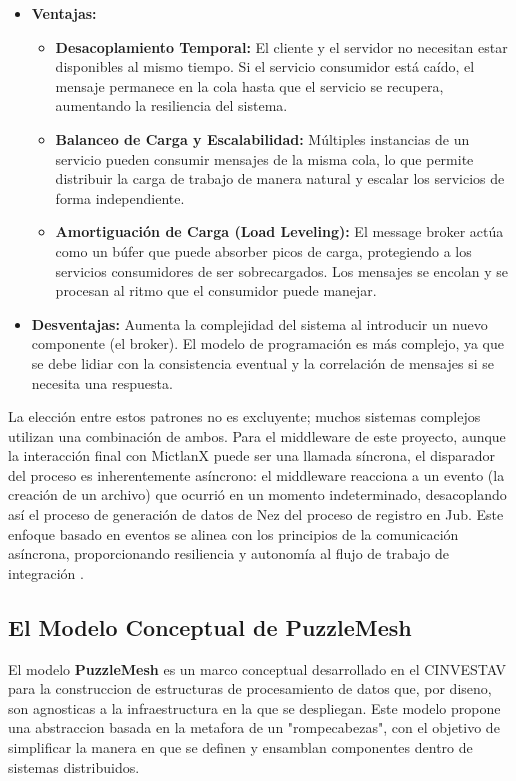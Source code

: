 \begin{itemize}
    \item \textbf{Ventajas:}
    \begin{itemize}
        \item \textbf{Desacoplamiento Temporal:} El cliente y el servidor no necesitan estar disponibles al mismo tiempo. Si el servicio consumidor está caído, el mensaje permanece en la cola hasta que el servicio se recupera, aumentando la resiliencia del sistema.
        \item \textbf{Balanceo de Carga y Escalabilidad:} Múltiples instancias de un servicio pueden consumir mensajes de la misma cola, lo que permite distribuir la carga de trabajo de manera natural y escalar los servicios de forma independiente.
        \item \textbf{Amortiguación de Carga (Load Leveling):} El message broker actúa como un búfer que puede absorber picos de carga, protegiendo a los servicios consumidores de ser sobrecargados. Los mensajes se encolan y se procesan al ritmo que el consumidor puede manejar.
    \end{itemize}
    \item \textbf{Desventajas:} Aumenta la complejidad del sistema al introducir un nuevo componente (el broker). El modelo de programación es más complejo, ya que se debe lidiar con la consistencia eventual y la correlación de mensajes si se necesita una respuesta.
\end{itemize}

La elección entre estos patrones no es excluyente; muchos sistemas complejos utilizan una combinación de ambos. Para el middleware de este proyecto, aunque la interacción final con MictlanX puede ser una llamada síncrona, el disparador del proceso es inherentemente asíncrono: el middleware reacciona a un evento (la creación de un archivo) que ocurrió en un momento indeterminado, desacoplando así el proceso de generación de datos de Nez del proceso de registro en Jub. Este enfoque basado en eventos se alinea con los principios de la comunicación asíncrona, proporcionando resiliencia y autonomía al flujo de trabajo de integración \cite{hohpe2003enterprise}.

\subsection{El Modelo Conceptual de PuzzleMesh}

El modelo \textbf{PuzzleMesh} es un marco conceptual desarrollado en el CINVESTAV para la construccion de estructuras de procesamiento de datos que, por diseno, son agnosticas a la infraestructura en la que se despliegan. Este modelo propone una abstraccion basada en la metafora de un "rompecabezas", con el objetivo de simplificar la manera en que se definen y ensamblan componentes dentro de sistemas distribuidos.

